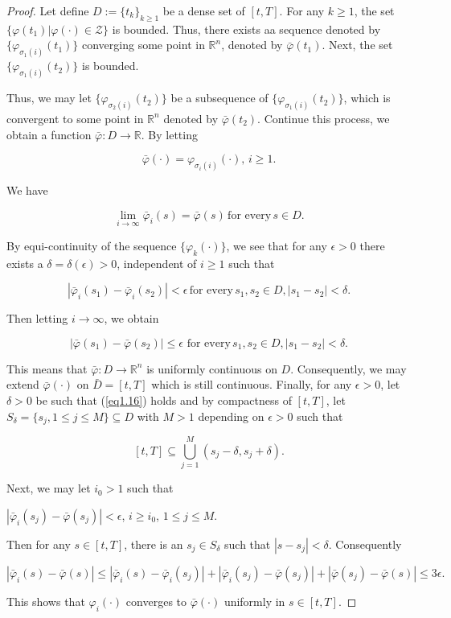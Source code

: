 \begin{proof}
Let define $D:=\{t_k\}_{k\geq 1}$ be a dense set of $[t,T]$. For any $k\geq 1$, the set $\{\varphi(t_1)|\varphi(\cdot)\in \mathcal{Z}\}$ is bounded. Thus, there exists aa sequence denoted by $\{\varphi_{\sigma_1(i)}(t_1)\}$ converging some point in $\mathbb{R}^n$, denoted by $\bar{\varphi}(t_1)$. Next, the set $\{\varphi_{\sigma_1(i)}(t_2)\}$ is bounded.

Thus, we may let $\{\varphi_{\sigma_2(i)}(t_2)\}$ be a subsequence of $\{\varphi_{\sigma_1(i)}(t_2)\}$, which is convergent to some point in $\mathbb{R}^n$ denoted by $\bar{\varphi}(t_2)$. Continue this process, we obtain a function $\bar{\varphi}:D\rightarrow \mathbb{R}$. By letting

$$\bar{\varphi}(\cdot)=\varphi_{\sigma_i(i)}(\cdot),\, i\geq 1.$$

We have 

$$\lim_{i\rightarrow \infty} \bar{\varphi}_i(s)=\bar{\varphi}(s)\,\mbox{for every}\, s\in D.$$

By equi-continuity of the sequence $\{\varphi_k(\cdot)\}$, we see that for any $\epsilon>0$ there exists a $\delta=\delta(\epsilon)>0$, independent of $i\geq 1$ such that

\begin{equation}\label{eq1.16}
	|\bar{\varphi}_i(s_1)-\bar{\varphi}_i(s_2)|<\epsilon\, \mbox{for every}\, s_1,s_2\in D, |s_1-s_2|<\delta.
\end{equation}

Then letting $i\rightarrow \infty$, we obtain

$$|\bar{\varphi}(s_1)-\bar{\varphi}(s_2)|\leq \epsilon\,\, \mbox{for every}\, s_1,s_2\in D, |s_1-s_2|<\delta.$$

This means that $\bar{\varphi}:D\rightarrow \mathbb{R}^n$ is uniformly continuous on $D$. Consequently, we may extend $\bar{\varphi}(\cdot)$ on $\bar{D}=[t,T]$ which is still continuous. Finally, for any $\epsilon>0$, let $\delta>0$ be such that (\ref{eq1.16}) holds and by compactness of $[t,T]$, let $S_{\delta}=\{s_j,1\leq j\leq M\}\subseteq D$ with $M>1$ depending on $\epsilon>0$ such that

$$[t,T]\subseteq \bigcup^M_{j=1}(s_j-\delta,s_j+\delta).$$

Next, we may let $i_0>1$ such that

\begin{center}
	$|\bar{\varphi}_i(s_j)-\bar{\varphi}(s_j)|<\epsilon$, $i\geq i_0$, $1\leq j\leq M$.
\end{center}

Then for any $s\in [t,T]$, there is an $s_j\in S_{\delta}$ such that $|s-s_j|<\delta$. Consequently 

$$|\bar{\varphi}_i(s)-\bar{\varphi}(s)|\leq |\bar{\varphi}_i(s)-\bar{\varphi}_i(s_j)|+|\bar{\varphi}_i(s_j)-\bar{\varphi}(s_j)|+|\bar{\varphi}(s_j)-\bar{\varphi}(s)|\leq 3\epsilon.$$

This shows that $\varphi_i(\cdot)$ converges to $\bar{\varphi} (\cdot)$ uniformly in $s\in [t,T]$.
\end{proof}

